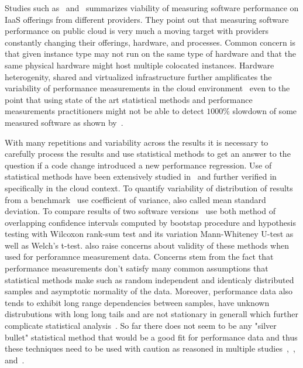 Studies such as~\citet{leitner2016patterns} and~\citet{laaber2019software} summarizes viability of measuring software performance on IaaS offerings from different providers.
They point out that measuring software performance on public cloud is very much a moving target with providers constantly changing their offerings, hardware, and processes.
Common concern is that given instance type may not run on the same type of hardware and that the same physical hardware might host multiple colocated instances.
Hardware heterogenity, shared and virtualized infrastructure further amplificates the variability of performance measurements in the cloud environment~\cite{leitner2016patterns} even to the point that using state of the art statistical methods and performance measurements practitioners might not be able to detect $1000\%$ slowdown of some measured software as shown by~\citet{laaber2019software}.

With many repetitions and variability across the results it is necessary to carefully process the results and use statistical methods to get an answer to the question if a code change introduced a new performance regression.
Use of statistical methods have been extensively studied in~\citet{bulej2017stat} and further verified in~\citet{laaber2019software} specifically in the cloud context.
To quantify variability of distribution of results from a benchmark~\citet{laaber2019software} use coefficient of variance, also called mean standard deviation.
To compare results of two software versions~\citet{bulej2017stat} use both method of overlapping confidence intervals computed by bootstap procedure and hypothesis testing with Wilcoxon rank-sum test and its variation Mann-Whiteney U-test as well as Welch's t-test.
\citet{bulej2017stat} also raise concerns about validity of these methods when used for perforamnce measurement data.
Concerns stem from the fact that performance measurements don't satisfy many common assumptions that statistical methods make such as random independent and identicaly distributed samples and asymptotic normality of the data.
Moreover, performance data also tends to exhibit long range dependencies between samples, have unknown distrubutions with long long tails and are not stationary in generall which further complicate statistical analysis~\cite{bulej2017stat}.
So far there does not seem to be any "silver bullet" statistical method that would be a good fit for performance data and thus these techniques need to be used with caution as reasoned in multiple studies~\citet{leitner2016patterns},~\citet{laaber2019software}, and~\citet{bulej2017stat}.

